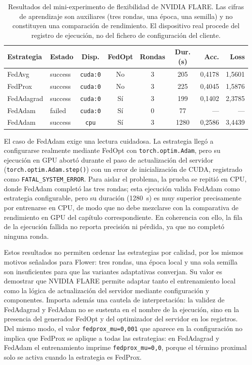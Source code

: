 \begin{table}[htbp]
  \centering
  \caption{Resultados del mini-experimento de flexibilidad de NVIDIA FLARE. Las
  cifras de aprendizaje son auxiliares (tres rondas, una época, una semilla) y no
  constituyen una comparación de rendimiento. El dispositivo real procede del
  registro de ejecución, no del fichero de configuración del cliente.}
  \label{tab:flex-nvflare-resultados}
  \begin{tabular}{llccccrr}
    \toprule
    \textbf{Estrategia} & \textbf{Estado} & \textbf{Disp.} & \textbf{FedOpt} &
    \textbf{Rondas} & \textbf{Dur. (s)} & \textbf{Acc.} & \textbf{Loss} \\
    \midrule
    FedAvg      & success & \texttt{cuda:0} & No  & 3 & 205  & 0,4178 & 1,5601 \\
    FedProx     & success & \texttt{cuda:0} & No  & 3 & 225  & 0,4045 & 1,5876 \\
    FedAdagrad  & success & \texttt{cuda:0} & Sí  & 3 & 199  & 0,1402 & 2,3785 \\
    FedAdam     & failed  & \texttt{cuda:0} & Sí  & 0 & 77   & ---    & ---    \\
    FedAdam     & success & \texttt{cpu}    & Sí  & 3 & 1280 & 0,2586 & 3,4439 \\
    \bottomrule
  \end{tabular}
\end{table}

El caso de FedAdam exige una lectura cuidadosa. La estrategia llegó a configurarse
realmente mediante FedOpt con \texttt{torch.optim.Adam}, pero su ejecución
en GPU abortó durante el paso de actualización del servidor
(\texttt{torch.optim.Adam.step()}) con un error de inicialización de
CUDA, registrado como \texttt{FATAL\_SYSTEM\_ERROR}. Para aislar el problema, la
prueba se repitió en CPU, donde FedAdam completó las tres rondas; esta ejecución
valida FedAdam como estrategia configurable, pero su duración (1280~s) es muy
superior precisamente por entrenarse en CPU, de modo que no debe mezclarse con la
comparativa de rendimiento en GPU del capítulo correspondiente. En coherencia con
ello, la fila de la ejecución fallida no reporta precisión ni pérdida, ya que no
completó ninguna ronda.

Estos resultados no permiten ordenar las estrategias por calidad, por los mismos
motivos señalados para Flower: tres rondas, una época local y una sola semilla son
insuficientes para que las variantes adaptativas converjan. Su valor es
demostrar que NVIDIA FLARE permite adaptar tanto el entrenamiento local como la
lógica de actualización del servidor mediante configuración y componentes. Importa
además una cautela de interpretación: la validez de FedAdagrad y FedAdam no se
sustenta en el nombre de la ejecución, sino en la presencia del generador FedOpt y
del optimizador del servidor en los registros. Del mismo modo, el valor
\texttt{fedprox\_mu=0,001} que aparece en la configuración no implica que FedProx se
aplique a todas las estrategias: en FedAdagrad y FedAdam el entrenamiento imprime
\texttt{fedprox\_mu=0,0}, porque el término proximal solo se activa cuando la
estrategia es FedProx.


